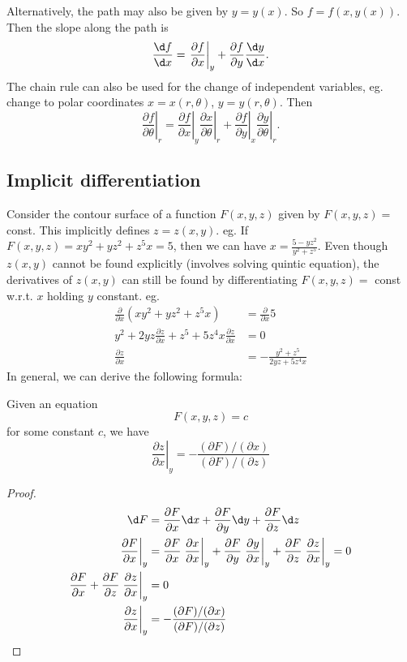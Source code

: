 \documentclass[a4paper]{article}
\begin{document}
Alternatively, the path may also be given by $y = y(x)$. So $f = f(x, y(x))$. Then the slope along the path is
\[
  \frac{\d f}{\d x} = \left.\frac{\partial f}{\partial x}\right|_y + \frac{\partial f}{\partial y}{\frac{\d y}{\d x}}.
\]
The chain rule can also be used for the change of independent variables, eg. change to polar coordinates $x = x(r, \theta)$, $y = y(r, \theta)$. Then
\[
  \left.\frac{\partial f}{\partial \theta}\right|_r = \left. \frac{\partial f}{\partial x}\right|_y \left.\frac{\partial x}{\partial \theta}\right|_r + \left.\frac{\partial f}{\partial y}\right|_x\left.\frac{\partial y}{\partial \theta}\right|_r.
\]
\subsection{Implicit differentiation}
Consider the contour surface of a function $F(x, y, z)$ given by $F(x, y, z) = $ const. This implicitly defines $z = z(x, y)$. eg. If $F(x, y, z) = xy^2 + yz^2 + z^5x = 5$, then we can have $x = \frac{5 - yz^2}{y^2 + z^5}$. Even though $z(x, y)$ cannot be found explicitly (involves solving quintic equation), the derivatives of $z(x, y)$ can still be found by differentiating $F(x, y, z) =$ const w.r.t. $x$ holding $y$ constant. eg.
\begin{align*}
  \frac{\partial }{\partial x}(xy^2 + yz^2 + z^5x) &= \frac{\partial }{\partial x}5\\
  y^2 + 2yz\frac{\partial z}{\partial x} + z^5 + 5z^4x\frac{\partial z}{\partial x} &= 0\\
  \frac{\partial z}{\partial x} &= -\frac{y^2 + z^5}{2yz + 5z^4x}
\end{align*}
In general, we can derive the following formula:
\begin{thm} Given an equation
  \[
    F(x, y, z) = c
  \]
  for some constant $c$, we have
  \[
    \left.\frac{\partial z}{\partial x}\right|_y = -\frac{(\partial F)/(\partial x)}{(\partial F)/(\partial z)}
  \]
\end{thm}

\begin{proof}
  \begin{align*}
    \d F &= \frac{\partial F}{\partial x}\d x + \frac{\partial F}{\partial y}\d y + \frac{\partial F}{\partial z}\d z\\
    \left.\frac{\partial F}{\partial x}\right|_y &= \frac{\partial F}{\partial x}\left.\frac{\partial x}{\partial x}\right|_y + \frac{\partial F}{\partial y}\left.\frac{\partial y}{\partial x}\right|_y + \frac{\partial F}{\partial z}\left.\frac{\partial z}{\partial x}\right|_y = 0\\
    \frac{\partial F}{\partial x} + \frac{\partial F}{\partial z}\left.\frac{\partial z}{\partial x}\right|_y &= 0\\
    \left.\frac{\partial z}{\partial x}\right|_y &= -\frac{(\partial F)/(\partial x)}{(\partial F)/(\partial z)}
  \end{align*}
\end{proof}
\end{document}

